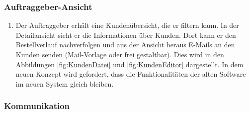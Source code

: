 \subsubsection{Auftraggeber-Ansicht}

\begin{enumerate}
\item Der Auftraggeber erhält eine Kundenübersicht, die er filtern kann. In der Detailansicht sieht er die Informationen über Kunden. Dort kann er den Bestellverlauf nachverfolgen und aus der Ansicht heraus E-Mails an den Kunden senden (Mail-Vorlage oder frei gestaltbar). Dies wird in den Abbildungen \ref{fig:KundenDatei} und \ref{fig:KundenEditor} dargestellt. In dem neuen Konzept wird gefordert, dass die Funktionalitäten der alten Software im neuen System gleich bleiben.
\end{enumerate} 

\subsubsection{Kommunikation}

